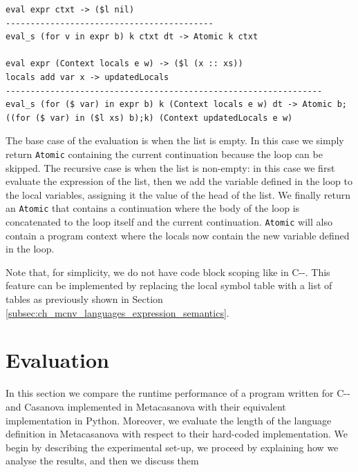 \begin{lstlisting}
eval expr ctxt -> ($l nil)
------------------------------------------
eval_s (for v in expr b) k ctxt dt -> Atomic k ctxt

eval expr (Context locals e w) -> ($l (x :: xs))
locals add var x -> updatedLocals
----------------------------------------------------------------
eval_s (for ($ var) in expr b) k (Context locals e w) dt -> Atomic b;((for ($ var) in ($l xs) b);k) (Context updatedLocals e w)
\end{lstlisting}

\noindent
The base case of the evaluation is when the list is empty. In this case we simply return \texttt{Atomic} containing the current continuation because the loop can be skipped. The recursive case is when the list is non-empty: in this case we first evaluate the expression of the list, then we add the variable defined in the loop to the local variables, assigning it the value of the head of the list. We finally return an \texttt{Atomic} that contains a continuation where the body of the loop is concatenated to the loop itself and the current continuation. \texttt{Atomic} will also contain a program context where the locals now contain the new variable defined in the loop.

Note that, for simplicity, we do not have code block scoping like in C-{}-. This feature can be implemented by replacing the local symbol table with a list of tables as previously shown in Section \ref{subsec:ch_mcnv_languages_expression_semantics}.

\section{Evaluation}
\label{ch:mcnv_languages_evaluation}
In this section we compare the runtime performance of a program written for C-{}- and Casanova implemented in Metacasanova with their equivalent implementation in Python. Moreover, we evaluate the length of the language definition in Metacasanova with respect to their hard-coded implementation. We begin by describing the experimental set-up, we proceed by explaining how we analyse the results, and then we discuss them

